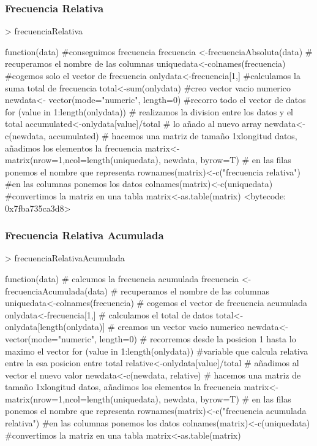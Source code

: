 \documentclass [a4paper] {article}
\begin{document}
\subsubsection{Frecuencia Relativa}
\begin{Schunk}
\begin{Sinput}
> frecuenciaRelativa
\end{Sinput}
\begin{Soutput}
function(data){
    #conseguimos frecuencia
    frecuencia <-frecuenciaAbsoluta(data)
    # recuperamos el nombre de las columnas
    uniquedata<-colnames(frecuencia)
    #cogemos solo el vector de frecuencia
    onlydata<-frecuencia[1,]
    #calculamos la suma total de frecuencia
    total<-sum(onlydata)
    #creo vector vacio numerico
    newdata<- vector(mode="numeric", length=0)
    #recorro todo el vector de datos
    for (value in 1:length(onlydata)) {
        # realizamos la division entre los datos y el total
        accumulated<-onlydata[value]/total
        # lo añado al nuevo array
        newdata<-c(newdata, accumulated)
    }
    # hacemos una matriz de tamaño 1xlongitud datos, añadimos los elementos la frecuencia
  matrix<-matrix(nrow=1,ncol=length(uniquedata), newdata, byrow=T)
  # en las filas ponemos el nombre que representa
  rownames(matrix)<-c("frecuencia relativa")
  #en las columnas ponemos los datos
  colnames(matrix)<-c(uniquedata)
  #convertimos la matriz en una tabla
  matrix<-as.table(matrix)
}
<bytecode: 0x7fba735ca3d8>
\end{Soutput}
\end{Schunk}
\subsubsection{Frecuencia Relativa Acumulada}
\begin{Schunk}
\begin{Sinput}
> frecuenciaRelativaAcumulada
\end{Sinput}
\begin{Soutput}
function(data){
    # calcumos la frecuencia acumulada
    frecuencia <-frecuenciaAcumulada(data)
    # recuperamos el nombre de las columnas
    uniquedata<-colnames(frecuencia)
    # cogemos el vector de frecuencia acumulada
    onlydata<-frecuencia[1,]
    # calculamos el total de datos 
    total<-onlydata[length(onlydata)]
    # creamos un vector vacio numerico
    newdata<- vector(mode="numeric", length=0)
    # recorremos desde la posicion 1 hasta lo maximo el vector
    for (value in 1:length(onlydata)) {
        #variable que calcula relativa entre la esa posicion entre total 
        relative<-onlydata[value]/total
        # añadimos al vector el nuevo valor
        newdata<-c(newdata, relative)
    }
    # hacemos una matriz de tamaño 1xlongitud datos, añadimos los elementos la frecuencia
  matrix<-matrix(nrow=1,ncol=length(uniquedata), newdata, byrow=T)
  # en las filas ponemos el nombre que representa
  rownames(matrix)<-c("frecuencia acumulada relativa")
  #en las columnas ponemos los datos
  colnames(matrix)<-c(uniquedata)
  #convertimos la matriz en una tabla
  matrix<-as.table(matrix)
}
\end{Soutput}
\end{Schunk}
\end{document}
